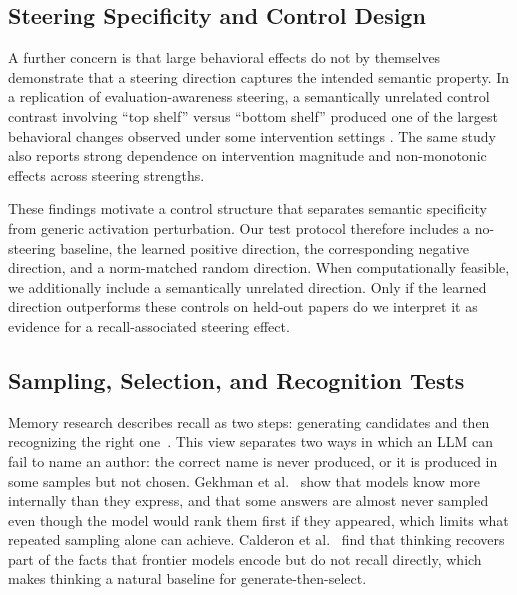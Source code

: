 \documentclass[sigconf,nonacm]{acmart}
\begin{document}
 
\subsection{Steering Specificity and Control Design}
 
A further concern is that large behavioral effects do not by themselves
demonstrate that a steering direction captures the intended semantic
property. In a replication of evaluation-awareness steering, a
semantically unrelated control contrast involving ``top shelf'' versus
``bottom shelf'' produced one of the largest behavioral changes observed
under some intervention settings \cite{read2026evaluationsteering}.
The same study also reports strong dependence on intervention magnitude
and non-monotonic effects across steering strengths.
 
These findings motivate a control structure that separates semantic
specificity from generic activation perturbation. Our test protocol
therefore includes a no-steering baseline, the learned positive
direction, the corresponding negative direction, and a norm-matched
random direction. When computationally feasible, we additionally include
a semantically unrelated direction. Only if the learned direction
outperforms these controls on held-out papers do we interpret it as
evidence for a recall-associated steering effect.
 
\subsection{Sampling, Selection, and Recognition Tests}
 
Memory research describes recall as two steps: generating candidates and then recognizing the right one~\cite{kintsch1970models,anderson1972recognition}. This view separates two ways in which an LLM can fail to name an author: the correct name is never produced, or it is produced in some samples but not chosen. Gekhman et al.~\cite{gekhman2025insideout} show that models know more internally than they express, and that some answers are almost never sampled even though the model would rank them first if they appeared, which limits what repeated sampling alone can achieve. Calderon et al.~\cite{calderon2026emptyshelves} find that thinking recovers part of the facts that frontier models encode but do not recall directly, which makes thinking a natural baseline for generate-then-select.
\end{document}
